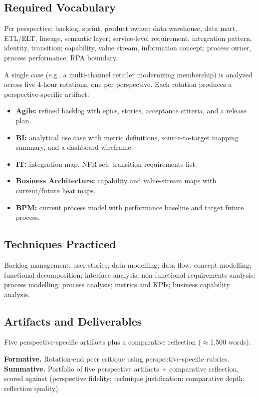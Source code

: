 \documentclass[11pt,letterpaper,oneside]{report}
\begin{document}
\subsection*{Required Vocabulary}
Per perspective: backlog, sprint, product owner; data warehouse, data mart, ETL/ELT, lineage, semantic layer; service-level requirement, integration pattern, identity, transition; capability, value stream, information concept; process owner, process performance, RPA boundary.

\begin{labbox}
A single case (e.g., a multi-channel retailer modernizing membership) is analyzed across five 4-hour rotations, one per perspective. Each rotation produces a perspective-specific artifact:
\begin{itemize}
  \item \textbf{Agile:} refined backlog with epics, stories, acceptance criteria, and a release plan.
  \item \textbf{BI:} analytical use case with metric definitions, source-to-target mapping summary, and a dashboard wireframe.
  \item \textbf{IT:} integration map, NFR set, transition requirements list.
  \item \textbf{Business Architecture:} capability and value-stream maps with current/future heat maps.
  \item \textbf{BPM:} current process model with performance baseline and target future process.
\end{itemize}
\end{labbox}

\subsection*{Techniques Practiced}
Backlog management; user stories; data modelling; data flow; concept modelling; functional decomposition; interface analysis; non-functional requirements analysis; process modelling; process analysis; metrics and KPIs; business capability analysis.

\subsection*{Artifacts and Deliverables}
Five perspective-specific artifacts plus a comparative reflection ($\approx$1{,}500 words).

\begin{curriculumassessment}
\textbf{Formative.} Rotation-end peer critique using perspective-specific rubrics.\\[3pt]
\textbf{Summative.} Portfolio of five perspective artifacts + comparative reflection, scored against  (perspective fidelity; technique justification; comparative depth; reflection quality).
\end{curriculumassessment}
\end{document}
